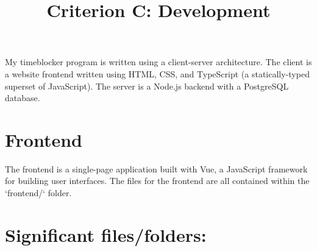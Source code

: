 \documentclass[notitlepage, 12pt]{report}
\title{Criterion C: Development}
\author{} %
\begin{document}
\maketitle

My timeblocker program is written using a client-server architecture. The client is a website frontend written using HTML, CSS, and TypeScript (a statically-typed superset of JavaScript). The server is a Node.js backend with a PostgreSQL database.

\section*{Frontend}
The frontend is a single-page application built with Vue, a JavaScript framework for building user interfaces. The files for the frontend are all contained within the `frontend/` folder.

\section*{Significant files/folders:}
\end{document}
